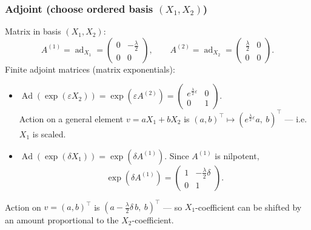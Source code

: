 \documentclass{article}
\begin{document}
\subsubsection*{Adjoint (choose ordered basis $(X_1,X_2)$)}
 Matrix in basis $(X_1,X_2)$:
\begin{equation*}
  A^{(1)}=\operatorname{ad}_{X_1}=
  \begin{pmatrix}
  0 & -\tfrac{\lambda}{2}\\[4pt]
  0 & 0
  \end{pmatrix},\qquad   A^{(2)}=\operatorname{ad}_{X_2}=
  \begin{pmatrix}
  \tfrac{\lambda}{2} & 0\\[4pt]
  0 & 0
  \end{pmatrix}.
\end{equation*}
Finite adjoint matrices (matrix exponentials):
\begin{itemize}
\item $\operatorname{Ad}(\exp(\varepsilon X_2))=\exp(\varepsilon A^{(2)})=
  \begin{pmatrix}
  e^{\tfrac{\lambda}{2}\varepsilon} & 0\\[4pt]
  0 & 1
  \end{pmatrix}.$\\
    Action on a general element $v=a X_1+b X_2$ is
  $(a,b)^\top \mapsto (e^{\tfrac{\lambda}{2}\varepsilon}a,\ b)^\top$ — i.e. $X_1$ is scaled.
\item 
$\operatorname{Ad}(\exp(\delta X_1))=\exp(\delta A^{(1)})$. Since $A^{(1)}$ is nilpotent,
\begin{equation*}
 \exp(\delta A^{(1)})=
  \begin{pmatrix}
  1 & -\tfrac{\lambda}{2}\delta\\[4pt]
  0 & 1
  \end{pmatrix}.
\end{equation*}
\end{itemize}
  Action on $v=(a,b)^\top$ is $(a - \tfrac{\lambda}{2}\delta\,b,\ b)^\top$ — so $X_1$-coefficient can be shifted by an amount proportional to the $X_2$-coefficient.
\end{document}
